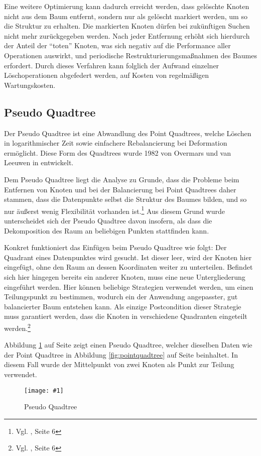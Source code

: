 \documentclass[%
			fontsize=12pt,%
			paper=a4,%
			DIV11,
			liststotoc,
			bibtotoc,
			draft=false,%
			titlepage
			]{scrartcl}
\newcommand{\zit}[3]{#1 \cite{#2}, #3}
\newcommand{\footzit}[3]{\footnote{\zit{#1}{#2}{#3}}}
\newcommand{\myfig}[5] {
 \begin{figure}[tbph]
	 \centering
	 \texttt{[image: \#1]}
	 \caption[#4]{#5}
	 \label{fig:#2}
 \end{figure}
}
\begin{document}
Eine weitere Optimierung kann dadurch erreicht werden, dass gelöschte Knoten nicht aus dem Baum entfernt, sondern nur als gelöscht markiert werden, um so die Struktur zu erhalten.
Die markierten Knoten dürfen bei zukünftigen Suchen nicht mehr zurückgegeben werden.
Nach jeder Entfernung erhöht sich hierdurch der Anteil der "`toten"' Knoten, was sich negativ auf die Performance aller Operationen auswirkt, und periodische Restrukturierungsmaßnahmen des Baumes erfordert.
Durch dieses Verfahren kann folglich der Aufwand einzelner Löschoperationen abgefedert werden, auf Kosten von regelmäßigen Wartungskosten.

\subsection{Pseudo Quadtree}
\label{sec:pseudoquadtree}
Der Pseudo Quadtree ist eine Abwandlung des Point Quadtrees, welche Löschen in logarithmischer Zeit sowie einfachere Rebalancierung bei Deformation ermöglicht. Diese Form des Quadtrees wurde 1982 von Overmars und van Leeuwen in \cite{DBLP:journals/acta/OvermarsL82} entwickelt.

Dem Pseudo Quadtree liegt die Analyse zu Grunde, dass die Probleme beim Entfernen von Knoten und bei der Balancierung bei Point Quadtrees daher stammen, dass die Datenpunkte selbst die Struktur des Baumes bilden, und so nur äußerst wenig Flexibilität vorhanden ist.\footzit{Vgl.}{DBLP:journals/acta/OvermarsL82}{Seite 6}
Aus diesem Grund wurde unterscheidet sich der Pseudo Quadtree davon insofern, als dass die Dekomposition des Raum an beliebigen Punkten stattfinden kann. 

Konkret funktioniert das Einfügen beim Pseudo Quadtree wie folgt:
Der Quadrant eines Datenpunktes wird gesucht.
Ist dieser leer, wird der Knoten hier eingefügt, ohne den Raum an dessen Koordinaten weiter zu unterteilen.
Befindet sich hier hingegen bereits ein anderer Knoten, muss eine neue Untergliederung eingeführt werden.
Hier können beliebige Strategien verwendet werden, um einen Teilungspunkt zu bestimmen, wodurch ein der Anwendung angepasster, gut balancierter Baum entstehen kann.
Als einzige Postcondition dieser Strategie muss garantiert werden,
dass die Knoten in verschiedene Quadranten eingeteilt werden.\footzit{Vgl.}{DBLP:journals/acta/OvermarsL82}{Seite 6}

Abbildung \ref{fig:pseudoquadtree} auf Seite \pageref{fig:pseudoquadtree} zeigt einen Pseudo Quadtree, welcher dieselben Daten wie der Point Quadtree in Abbildung \ref{fig:pointquadtree} auf Seite \pageref{fig:pointquadtree} beinhaltet.
In diesem Fall wurde der Mittelpunkt von zwei Knoten als Punkt zur Teilung verwendet.
\myfig{img/pseudoquadtree-ins3-trimmed}{pseudoquadtree}{width=.6\textwidth}{Pseudo Quadtree}{Pseudo Quadtree}
\end{document}
